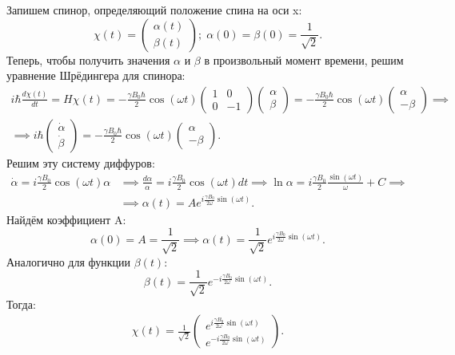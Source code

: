 Запишем спинор, определяющий положение спина на оси x:
\[
  \chi(t) = \begin{pmatrix}\alpha(t)\\ \beta(t)\end{pmatrix}; \; \alpha(0) = \beta(0) = \frac{1}{\sqrt{2}}.
\]
Теперь, чтобы получить значения $\alpha$ и $\beta$ в произвольный момент
времени, решим уравнение Шрёдингера для спинора:
\begin{gather*}
  i\hbar\frac{d\chi(t)}{dt} = H\chi(t) = -\frac{\gamma B_0\hbar}{2}\cos(\omega t)\begin{pmatrix} 1 & 0 \\ 0 & -1 \end{pmatrix}\begin{pmatrix}\alpha\\ \beta\end{pmatrix} =  -\frac{\gamma B_0\hbar}{2}\cos(\omega t) \begin{pmatrix} \alpha \\ -\beta \end{pmatrix} \implies \\
  \implies i\hbar\begin{pmatrix} \dot{\alpha}\\ \dot{\beta} \end{pmatrix} = -\frac{\gamma B_0\hbar}{2}\cos(\omega t) \begin{pmatrix} \alpha \\ -\beta \end{pmatrix}.
\end{gather*}
Решим эту систему диффуров:
\begin{align*}
  \dot{\alpha} = i\frac{\gamma B_0}{2}\cos(\omega t)\alpha &\implies \frac{d\alpha}{\alpha} = i\frac{\gamma B_0}{2}\cos(\omega t)dt \implies \ln\alpha = i\frac{\gamma B_0}{2}\frac{\sin(\omega t)}{\omega} + C \implies \\
  & \implies \alpha(t) = Ae^{i\frac{\gamma B_0}{2\omega}\sin(\omega t)}.
\end{align*}
Найдём коэффициент A:
\[
  \alpha(0) = A = \frac{1}{\sqrt{2}} \implies \alpha(t) = \frac{1}{\sqrt{2}}e^{i\frac{\gamma B_0}{2\omega}\sin(\omega t)}.
\]
Аналогично для функции $\beta(t)$:
\[
  \beta(t) = \frac{1}{\sqrt{2}}e^{-i\frac{\gamma B_0}{2\omega}\sin(\omega t)}.
\]
Тогда:
\begin{align*}
  \chi(t) = \frac{1}{\sqrt{2}}\begin{pmatrix} e^{i\frac{\gamma B_0}{2\omega}\sin(\omega t)} \\ e^{-i\frac{\gamma B_0}{2\omega}\sin(\omega t)} \end{pmatrix}.
\end{align*}

